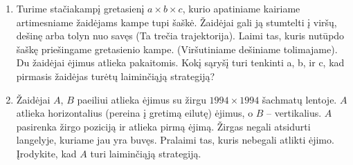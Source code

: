 \begin{enumerate}
\item Turime stačiakampį gretasienį  $a\times b\times c$, kurio apatiniame kairiame artimesniame žaidėjams kampe tupi šaškė. Žaidėjai gali ją stumtelti į viršų, dešinę arba tolyn nuo savęs (Ta trečia trajektorija). Laimi tas, kuris nutūpdo šaškę priešingame gretasienio kampe. (Viršutiniame dešiniame tolimajame). Du žaidėjai ėjimus atlieka pakaitomis. Kokį sąryšį turi tenkinti a, b, ir c, kad pirmasis žaidėjas turėtų laiminčiąją strategiją?


\item {} Žaidėjai $A$, $B$ paeiliui atlieka ėjimus su
  žirgu  $1994\times 1994$ šachmatų lentoje. $A$ atlieka horizontalius (pereina
  į gretimą eilutę) ėjimus, o $B$ – vertikalius. $A$ pasirenka žirgo poziciją
  ir atlieka pirmą ėjimą. Žirgas negali atsidurti langelyje, kuriame jau
  yra buvęs. Pralaimi tas, kuris nebegali atlikti ėjimo. Įrodykite, kad $A$
  turi laiminčiąją strategiją.

%


\end{enumerate}
